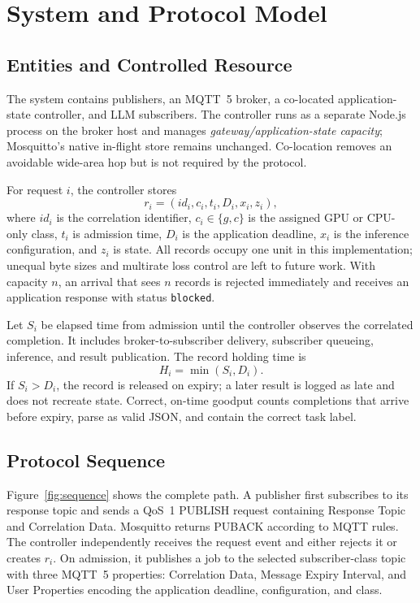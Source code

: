 \section{System and Protocol Model}
\label{sec:system}

\subsection{Entities and Controlled Resource}

The system contains publishers, an MQTT~5 broker, a co-located application-state controller, and LLM subscribers. The controller runs as a separate Node.js process on the broker host and manages \emph{gateway/application-state capacity}; Mosquitto's native in-flight store remains unchanged. Co-location removes an avoidable wide-area hop but is not required by the protocol.

For request $i$, the controller stores
\begin{equation}
 r_i=(id_i,c_i,t_i,D_i,x_i,z_i),
\end{equation}
where $id_i$ is the correlation identifier, $c_i\in\{g,c\}$ is the assigned GPU or CPU-only class, $t_i$ is admission time, $D_i$ is the application deadline, $x_i$ is the inference configuration, and $z_i$ is state. All records occupy one unit in this implementation; unequal byte sizes and multirate loss control are left to future work. With capacity $n$, an arrival that sees $n$ records is rejected immediately and receives an application response with status \texttt{blocked}.

Let $S_{i}$ be elapsed time from admission until the controller observes the correlated completion. It includes broker-to-subscriber delivery, subscriber queueing, inference, and result publication. The record holding time is
\begin{equation}
 H_i=\min(S_i,D_i).
 \label{eq:holding}
\end{equation}
If $S_i>D_i$, the record is released on expiry; a later result is logged as late and does not recreate state. Correct, on-time goodput counts completions that arrive before expiry, parse as valid JSON, and contain the correct task label.

\subsection{Protocol Sequence}

Figure~\ref{fig:sequence} shows the complete path. A publisher first subscribes to its response topic and sends a QoS~1 PUBLISH request containing Response Topic and Correlation Data. Mosquitto returns PUBACK according to MQTT rules. The controller independently receives the request event and either rejects it or creates $r_i$. On admission, it publishes a job to the selected subscriber-class topic with three MQTT~5 properties: Correlation Data, Message Expiry Interval, and User Properties encoding the application deadline, configuration, and class.

